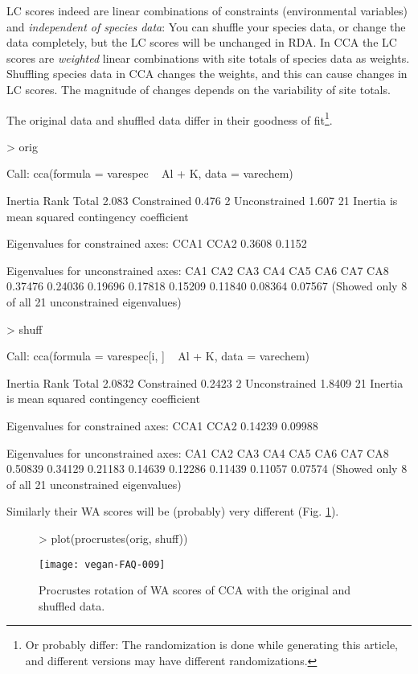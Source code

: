 \documentclass[a4paper]{article}
\begin{document}
LC scores indeed are linear combinations of constraints (environmental
variables) and \emph{independent of species data}: You can
shuffle your species data, or change the data completely, but the LC
scores will be unchanged in RDA.  In CCA the LC scores are
\emph{weighted} linear combinations with site totals of species data
as weights. Shuffling species data in CCA changes the weights, and
this can cause changes in LC scores.  The magnitude of changes depends
on the variability of site totals.

The original data and shuffled data differ in their goodness of
fit\footnote{Or probably differ: The randomization is done while
generating this article, and different versions may have different
randomizations.}.
\begin{Schunk}
\begin{Sinput}
> orig
\end{Sinput}
\begin{Soutput}
Call:
cca(formula = varespec ~ Al + K, data = varechem) 

              Inertia Rank
Total           2.083     
Constrained     0.476    2
Unconstrained   1.607   21
Inertia is mean squared contingency coefficient 

Eigenvalues for constrained axes:
  CCA1   CCA2 
0.3608 0.1152 

Eigenvalues for unconstrained axes:
    CA1     CA2     CA3     CA4     CA5     CA6     CA7     CA8 
0.37476 0.24036 0.19696 0.17818 0.15209 0.11840 0.08364 0.07567 
(Showed only 8 of all 21 unconstrained eigenvalues)
\end{Soutput}
\begin{Sinput}
> shuff
\end{Sinput}
\begin{Soutput}
Call:
cca(formula = varespec[i, ] ~ Al + K, data = varechem) 

              Inertia Rank
Total          2.0832     
Constrained    0.2423    2
Unconstrained  1.8409   21
Inertia is mean squared contingency coefficient 

Eigenvalues for constrained axes:
   CCA1    CCA2 
0.14239 0.09988 

Eigenvalues for unconstrained axes:
    CA1     CA2     CA3     CA4     CA5     CA6     CA7     CA8 
0.50839 0.34129 0.21183 0.14639 0.12286 0.11439 0.11057 0.07574 
(Showed only 8 of all 21 unconstrained eigenvalues)
\end{Soutput}
\end{Schunk}
Similarly their WA scores will be (probably) very different
(Fig. \ref{fig:ccawa}).
\begin{figure}
\begin{center}
\begin{Schunk}
\begin{Sinput}
> plot(procrustes(orig, shuff))
\end{Sinput}
\end{Schunk}
\texttt{[image: vegan-FAQ-009]}
\caption{Procrustes rotation of WA scores of CCA with the original and
  shuffled data.}
\label{fig:ccawa}
\end{center}
\end{figure}
\end{document}
